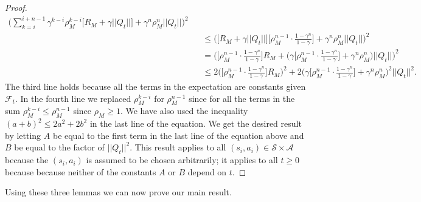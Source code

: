 \begin{proof}
\begin{align*}
	\Big(
    \sum^{i+n-1}_{k=i} \gamma^{k-i} \rho^{k-i}_M  \Big[ R_M    
	+ \gamma || Q_t || \Big] + \gamma^n \rho^n_M || Q_t ||
    \Big)^2
    \\
& \hspace{10pt} \leq
	\Big( \big[R_M + \gamma || Q_t || \big] \Big[\rho^{n-1}_M \cdot \frac{1-\gamma^n}{1-\gamma} \Big]
    + \gamma^n \rho^n_M || Q_t ||
    \Big)^2
    \\
& \hspace{10pt} = 
	\Big(
	\Big[\rho^{n-1}_M \cdot \frac{1-\gamma^n}{1-\gamma} \Big] R_M 
    + \Big( \gamma \Big[\rho^{n-1}_M \cdot \frac{1-\gamma^n}{1-\gamma} \Big] + \gamma^n \rho^n_M 
    \Big) || Q_t ||
    \Big)^2
    \\
& \hspace{10pt} \leq
	2 \Big(\Big[\rho^{n-1}_M \cdot \frac{1-\gamma^n}{1-\gamma} \Big] R_M \Big)^2 
    + 2 \Big( \gamma \Big[\rho^{n-1}_M \cdot \frac{1-\gamma^n}{1-\gamma} \Big] + \gamma^n \rho^n_M 
    \Big)^2 || Q_t ||^2.
\end{align*}
%
The third line holds because all the terms in the expectation are constants given $\mathcal{F}_t$.
In the fourth line we replaced $\rho^{k-i}_M$ for $\rho^{n-1}_M$ since for all the terms in the sum $\rho^{k-i}_M \leq \rho^{n-1}_M$ since $\rho_M \geq 1$.
We have also used the inequality $(a + b)^2 \leq 2a^2 + 2b^2$ in the last line of the equation.
We get the desired result by letting $A$ be equal to the first term in the last line of the equation above and $B$ be equal to the factor of $||Q_t ||^2$.
This result applies to all $(s_i, a_i) \in \mathcal{S} \times \mathcal{A}$ because the $(s_i, a_i)$ is assumed to be chosen arbitrarily; it applies to all $t \geq 0$ because because neither of the constants $A$ or $B$ depend on $t$.
\end{proof}

Using these three lemmas we can now prove our main result.

